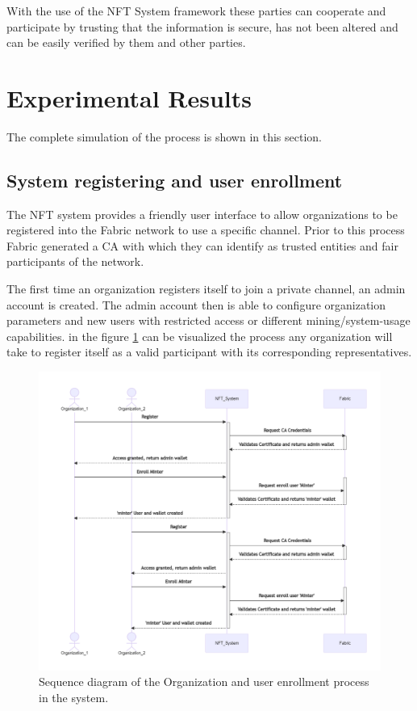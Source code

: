 With the use of the NFT System framework these parties can cooperate and participate by trusting that the information is secure, has not been altered and can be easily verified by them and other parties.

\section{Experimental Results}
The complete simulation of the process is shown in this section.

\subsection{System registering and user enrollment}
The NFT system provides a friendly user interface to allow organizations to be registered into the Fabric network to use a specific channel. 
Prior to this process Fabric generated a \ac{CA} with which they can identify as trusted entities and fair participants of the network.

The first time an organization registers itself to join a private channel, an admin account is created. The admin account then is able to configure organization parameters and new users with restricted access or different mining/system-usage capabilities.
in the figure \ref{fig:SeqDiag_RegisterEnroll} can be visualized the process any organization will take to register itself as a valid participant with its corresponding representatives.

 \begin{figure}[!h]
        \centering
        \includegraphics[width=15cm]{img/SequenceDiagram_RegisterEnroll.png}
        \caption{Sequence diagram of the Organization and user enrollment process in the system.}
        \label{fig:SeqDiag_RegisterEnroll}
    \end{figure}


